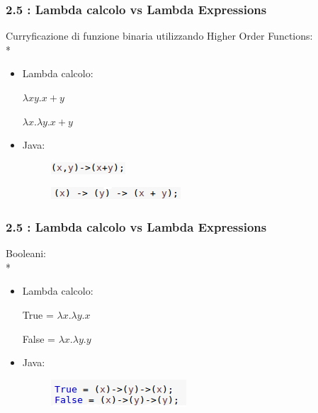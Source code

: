 \documentclass{beamer}
\begin{document}
\begin{frame}
\frametitle{\textbf{2.5 : Lambda calcolo vs Lambda Expressions}}
Curryficazione di funzione binaria utilizzando Higher Order Functions:\\*
\begin{itemize}
	\item Lambda calcolo:\begin{center}$\lambda xy.x+y$\end{center}\begin{center} $\lambda x.\lambda y.x+y$ \end{center}
	\item Java:
		\begin{figure}
		\centering
		\includegraphics[width=0.3\linewidth]{double}
		
		\label{fig:double}
	\end{figure}
	\begin{figure}
		\centering
		\includegraphics[width=0.4\linewidth]{curry}
		
		\label{fig:curry}
	\end{figure}
	
\end{itemize}
\end{frame}

\begin{frame}
\frametitle{\textbf{2.5 : Lambda calcolo vs Lambda Expressions}}
Booleani:\\*
\begin{itemize}
	\item Lambda calcolo:\begin{center} True = $\lambda x.\lambda y.x$ \end{center}
	\begin{center} False =  $\lambda x.\lambda y.y$ \end{center}
	\item Java:
	\begin{figure}
		\centering
		\includegraphics[width=0.4\linewidth]{booleani}
		
		\label{fig:identity}
	\end{figure}
	
\end{itemize}
\end{frame}
\end{document}
